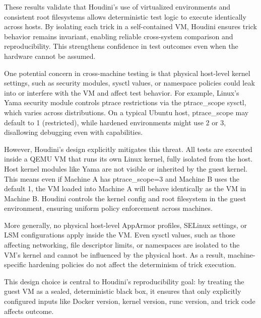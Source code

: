 \documentclass[12pt]{report}
\begin{document}
\begin{doublespace}
These results validate that Houdini’s use of virtualized environments and consistent root filesystems allows deterministic test logic to execute identically across hosts. By isolating each trick in a self-contained VM, Houdini ensures trick behavior remains invariant, enabling reliable cross-system comparison and reproducibility. This strengthens confidence in test outcomes even when the hardware cannot be assumed.

One potential concern in cross-machine testing is that physical host-level kernel settings, such as security modules, sysctl values, or namespace policies could leak into or interfere with the VM and affect test behavior. For example, Linux’s Yama security module controls ptrace restrictions via the ptrace\_scope sysctl, which varies across distributions. On a typical Ubuntu host, ptrace\_scope may default to 1 (restricted), while hardened environments might use 2 or 3, disallowing debugging even with capabilities.

However, Houdini’s design explicitly mitigates this threat. All tests are executed inside a QEMU VM that runs its own Linux kernel, fully isolated from the host. Host kernel modules like Yama are not visible or inherited by the guest kernel. This means even if Machine A has ptrace\_scope=3 and Machine B uses the default 1, the VM loaded into Machine A will behave identically as the VM in Machine B. Houdini controls the kernel config and root filesystem in the guest environment, ensuring uniform policy enforcement across machines.

More generally, no physical host-level AppArmor profiles, SELinux settings, or LSM configurations apply inside the VM. Even sysctl values, such as those affecting networking, file descriptor limits, or namespaces are isolated to the VM’s kernel and cannot be influenced by the physical host. As a result, machine-specific hardening policies do not affect the determinism of trick execution.

This design choice is central to Houdini’s reproducibility goal: by treating the guest VM as a sealed, deterministic black box, it ensures that only explicitly configured inputs like Docker version, kernel version, runc version, and trick code affects outcome.

































\end{doublespace}
\end{document}
